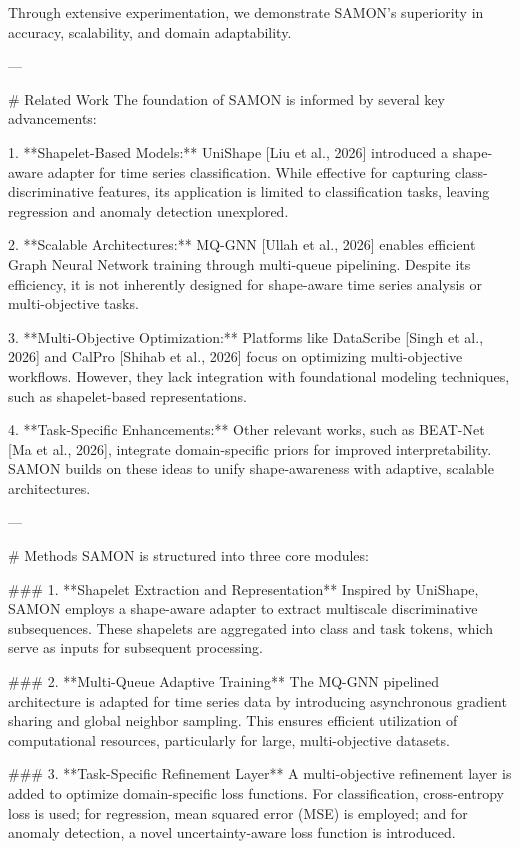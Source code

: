 Through extensive experimentation, we demonstrate SAMON's superiority in accuracy, scalability, and domain adaptability.

---

# Related Work  
The foundation of SAMON is informed by several key advancements:

1. **Shapelet-Based Models:** UniShape [Liu et al., 2026] introduced a shape-aware adapter for time series classification. While effective for capturing class-discriminative features, its application is limited to classification tasks, leaving regression and anomaly detection unexplored.

2. **Scalable Architectures:** MQ-GNN [Ullah et al., 2026] enables efficient Graph Neural Network training through multi-queue pipelining. Despite its efficiency, it is not inherently designed for shape-aware time series analysis or multi-objective tasks.

3. **Multi-Objective Optimization:** Platforms like DataScribe [Singh et al., 2026] and CalPro [Shihab et al., 2026] focus on optimizing multi-objective workflows. However, they lack integration with foundational modeling techniques, such as shapelet-based representations.

4. **Task-Specific Enhancements:** Other relevant works, such as BEAT-Net [Ma et al., 2026], integrate domain-specific priors for improved interpretability. SAMON builds on these ideas to unify shape-awareness with adaptive, scalable architectures.

---

# Methods  
SAMON is structured into three core modules:

### 1. **Shapelet Extraction and Representation**  
Inspired by UniShape, SAMON employs a shape-aware adapter to extract multiscale discriminative subsequences. These shapelets are aggregated into class and task tokens, which serve as inputs for subsequent processing.

### 2. **Multi-Queue Adaptive Training**  
The MQ-GNN pipelined architecture is adapted for time series data by introducing asynchronous gradient sharing and global neighbor sampling. This ensures efficient utilization of computational resources, particularly for large, multi-objective datasets.

### 3. **Task-Specific Refinement Layer**  
A multi-objective refinement layer is added to optimize domain-specific loss functions. For classification, cross-entropy loss is used; for regression, mean squared error (MSE) is employed; and for anomaly detection, a novel uncertainty-aware loss function is introduced.

